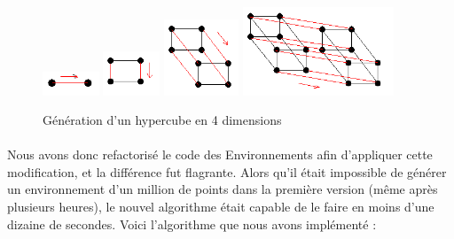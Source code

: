 \documentclass[pidr]{tnreport}
\begin{document}
\begin{figure}[H]
    \includegraphics[width=0.15\textwidth]{./figures/Hypercube-dim1.PNG}
    \includegraphics[width=0.15\textwidth]{./figures/Hypercube-dim2.PNG}
    \includegraphics[width=0.2\textwidth]{./figures/Hypercube-dim3.PNG}
    \includegraphics[width=0.4\textwidth]{./figures/Hypercube-dim4.PNG}
    \caption{Génération d'un hypercube en 4 dimensions}
\end{figure}

\paragraph{}
Nous avons donc refactorisé le code des Environnements afin d'appliquer cette modification, et la différence fut flagrante. Alors qu'il était impossible de générer un environnement d'un million de points dans la première version (même après plusieurs heures), le nouvel algorithme était capable de le faire en moins d'une dizaine de secondes. \linebreak
Voici l'algorithme que nous avons implémenté : 
\end{document}
